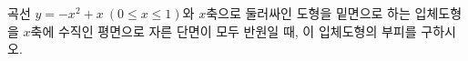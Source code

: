 곡선 $y=-x^2+x\ (0\le x\le 1)$와 $x$축으로 둘러싸인 도형을 밑면으로 하는 입체도형을 $x$축에 수직인 평면으로 자른 단면이 모두 반원일 때, 이 입체도형의 부피를 구하시오.
